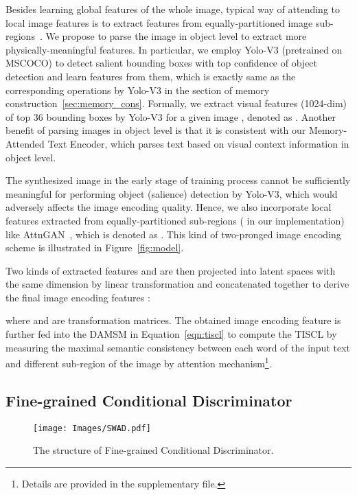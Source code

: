 \documentclass[runningheads]{llncs}
\begin{document}
\noindent Besides learning global features of the whole image, typical way of attending to local image features is to extract features from equally-partitioned image sub-regions~\cite{xu2018attngan}. We propose to parse the image in object level to extract more physically-meaningful features. In particular, we employ Yolo-V3 (pretrained on MSCOCO) to detect salient bounding boxes with top confidence of object detection and learn features from them, which is exactly same as the corresponding operations by Yolo-V3 in the section of memory construction~\ref{sec:memory_cons}. Formally, we extract visual features (1024-dim) of top 36 bounding boxes by Yolo-V3 for a given image , denoted as . Another benefit of parsing images in object level is that it is consistent with our Memory-Attended Text Encoder, which parses text based on visual context information in object level.

\noindent The synthesized image in the early stage of training process cannot be sufficiently meaningful for performing object (salience) detection by Yolo-V3, which would adversely affects the image encoding quality. Hence, we also incorporate local features extracted from equally-partitioned sub-regions ( in our implementation) like AttnGAN~\cite{xu2018attngan}, which is denoted as . 
This kind of two-pronged image encoding scheme is illustrated in Figure~\ref{fig:model}.

\noindent Two kinds of extracted features  and  are then projected into latent spaces with the same dimension by linear transformation and concatenated together to derive the final image encoding features :

\noindent
where  and  are transformation matrices. The obtained image encoding feature  is further fed into the DAMSM in Equation~\ref{eqn:tiscl} to compute the TISCL by measuring the maximal semantic consistency between each word of the input text and different sub-region of the image by attention mechanism\footnote{Details are provided in the supplementary file.}.

\subsection{Fine-grained Conditional Discriminator}
\label{sec:gan_dis}

\begin{figure}[t]
\centering
\texttt{[image: Images/SWAD.pdf]}
\caption{The structure of Fine-grained Conditional Discriminator.}
\label{fig:FGCD}
\end{figure}
\end{document}
